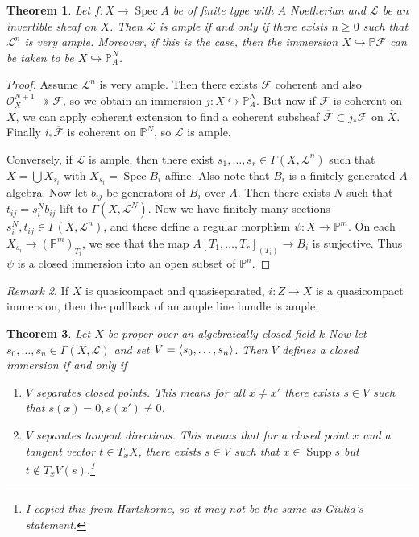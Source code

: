 \documentclass[leqno, openany]{memoir}
\newtheorem{thm}{Theorem}[section]
\theoremstyle{definition}
\theoremstyle{remark}
\newtheorem{rmk}[thm]{Remark}
\theoremstyle{plain}
\theoremstyle{definition}
\theoremstyle{remark}
\renewcommand{\P}{\mathbb{P}}
\newcommand{\mc}[1]{\mathcal{#1}}
\newcommand{\ol}[1]{\overline{#1}}
\DeclareMathOperator{\Supp}{Supp}
\DeclareMathOperator{\Spec}{Spec}
\begin{document}
\begin{thm} Let $f \colon X \to \Spec A$ be of finite type with $A$ Noetherian
    and $\mc{L}$ be an invertible sheaf on $X$. Then $\mc{L}$ is ample if and
    only if there exists $n \geq 0$ such that $\mc{L}^n$ is very ample.
    Moreover, if this is the case, then the immersion $X \hookrightarrow \P
    \mc{F}$ can be taken to be $X \hookrightarrow \P^N_A$.  \end{thm}

\begin{proof} Assume $\mc{L}^n$ is very ample. Then there exists $\mc{F}$
    coherent and also $\mc{O}_X^{N+1} \twoheadrightarrow \mc{F}$, so we obtain
    an immersion $j \colon X \hookrightarrow \P^N_A$. But now if $\mc{F}$ is
    coherent on $X$, we can apply coherent extension to find a coherent
    subsheaf $\ol{\mc{F}} \subset j_* \mc{F}$ on $\ol{X}$. Finally $i_*
    \mc{\ol{F}}$ is coherent on $\P^N$, so $\mc{L}$ is ample.

    Conversely, if $\mc{L}$ is ample, then there exist $s_1, \ldots, s_r \in
\Gamma(X, \mc{L}^n)$ such that $X = \bigcup X_{s_i}$ with $X_{s_i} = \Spec B_i$
affine. Also note that $B_i$ is a finitely generated $A$-algebra. Now let
$b_{ij}$ be generators of $B_i$ over $A$. Then there exists $N$ such that
$t_{ij} = s_i^N b_{ij}$ lift to $\Gamma(X, \mc{L}^N)$. Now we have finitely
many sections $s_i^N, t_{ij} \in \Gamma(X, \mc{L}^n)$, and these define a
regular morphism $\psi \colon X \to \P^m$. On each $X_{s_i} \to
{(\P^m)}_{T_i}$, we see that the map ${A[T_1, \ldots, T_r]}_{(T_i)} \to B_i$ is
surjective. Thus $\psi$ is a closed immersion into an open subset of $\P^n$.
\end{proof}

\begin{rmk} If $X$ is quasicompact and quasiseparated, $i \colon Z \to X$ is a
quasicompact immersion, then the pullback of an ample line bundle is ample.
\end{rmk}

\begin{thm} Let $X$ be proper over an algebraically closed field $k$ Now let
    $s_0, \ldots, s_n \in \Gamma(X, \mc{L})$ and set $V = \ev{s_0, \ldots,
    s_n}$. Then $V$ defines a closed immersion if and only if \begin{enumerate}
        \item $V$ separates closed points. This means for all $x \neq x'$ there
            exists $s \in V$ such that $s(x) = 0, s(x') \neq 0$.  \item $V$
            separates tangent directions. This means that for a closed point
            $x$ and a tangent vector $t \in T_x X$, there exists $s \in V$ such
            that $x \in \Supp s$ but $t \notin T_x V(s)$.\footnote{I copied
            this from Hartshorne, so it may not be the same as Giulia's
        statement.} \end{enumerate} \end{thm}
\end{document}
